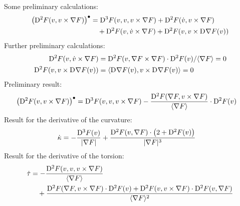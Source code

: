 Some preliminary calculations:
\begin{align}
    \left( \mathrm{D}^{ 2 }F( v, v \times \nabla F ) \right)^\bullet
    &=
    \mathrm{D}^{ 3 }F( v, v, v \times \nabla F )  +
    \mathrm{D}^{ 2 }F( \dot{ v }, v \times \nabla F )  \nonumber\\
    &\quad+
    \mathrm{D}^{ 2 }F( v, \dot{ v } \times \nabla F )  +
    \mathrm{D}^{ 2 }F( v, v \times \mathrm{D}^{  }\nabla F( v ) )
\end{align}
Further preliminary calculations:
\begin{subequations}
    \begin{align}
        \mathrm{D}^{ 2 }F( v, \dot{v} \times \nabla F )
        &=
        \mathrm{D}^{ 2 }F( v, \nabla F \times \nabla F ) \cdot
        \mathrm{D}^{ 2 }F( v ) / \langle  \nabla F  \rangle   =   0   \\
        \mathrm{D}^{ 2 }F( v,  v \times \mathrm{D}^{  }\nabla F( v ) )
        &=
        \langle  \mathrm{D}^{  }\nabla F( v ) ,  v \times \mathrm{D}^{  }\nabla F( v )  \rangle   =   0
    \end{align}
\end{subequations}
Preliminary result:
\begin{align}
    \left( \mathrm{D}^{ 2 }F( v, v \times \nabla F ) \right)^\bullet
    &=   \mathrm{D}^{ 3 }F( v, v, v \times \nabla F )  -
    \frac{ \mathrm{D}^{ 2 }F( \nabla F, v \times \nabla F ) }{ \langle  \nabla F  \rangle } \cdot
    \mathrm{D}^{ 2 }F( v )
\end{align}
Result for the derivative of the curvature:
\begin{align}
    \dot{ \kappa }   &=
    - \frac{ \mathrm{D}^{ 3 }F( v ) }{ \lvert  \nabla F  \rvert }  +
    \frac{ \mathrm{D}^{ 2 }F( v, \nabla F ) \cdot \left( 2 + \mathrm{D}^{ 2 }F( v ) \right) }{
    \lvert  \nabla F  \rvert^3 }
\end{align}
Result for the derivative of the torsion:
\begin{align}
    \dot{ \tau }   &=
    - \frac{ \mathrm{D}^{ 2 }F( v, v, v \times \nabla F ) }{ \langle  \nabla F  \rangle }  \nonumber\\
    &\quad+  \frac{ \mathrm{D}^{ 2 }F( \nabla F, v \times \nabla F ) \cdot \mathrm{D}^{ 2 }F( v )  +
    \mathrm{D}^{ 2 }F( v, v \times \nabla F ) \cdot \mathrm{D}^{ 2 }F( v, \nabla F ) }{
    \langle  \nabla F  \rangle^2 }
\end{align}